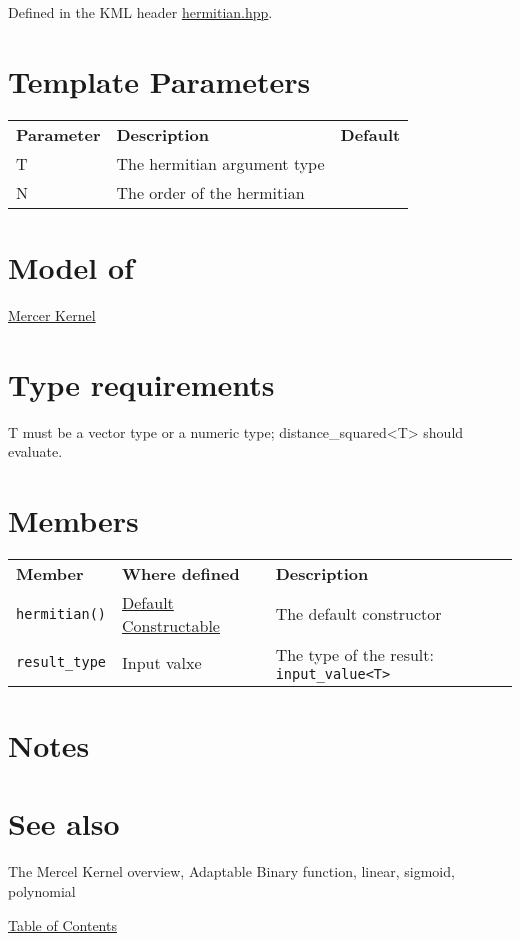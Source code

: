\documentclass{article}
\begin{document}
Defined in the KML header \href{hermitian.hpp}{hermitian.hpp}.


\section*{Template Parameters}

\begin{tabular}{lll}
\textbf{Parameter} & \textbf{Description} & \textbf{Default} \\ 
T & The hermitian argument type \\ 
N & The order of the hermitian \\ 
\end{tabular}


\section*{Model of}

\href{research/kml/documentation/mercer_kernel.html}{Mercer Kernel}

\section*{Type requirements}

T must be a vector type or a numeric type; distance_squared<T> should evaluate.


\section*{Members}

\begin{tabular}{lll}
\textbf{Member} & \textbf{Where defined} & \textbf{Description} \\ 
\texttt{hermitian()} & \href{http://www.sgi.com/tech/stl/DefaultConstructible.html}{Default Constructable} & The default constructor \\
\texttt{result_type} & Input valxe & The type of the result: \texttt{input_value<T>} \\
\end{tabular}

\section*{Notes}

\section*{See also}

The Mercel Kernel overview, Adaptable Binary function, linear, sigmoid, polynomial

\noindent \href{research/kml/documentation/}{Table of Contents}



\end{document}
